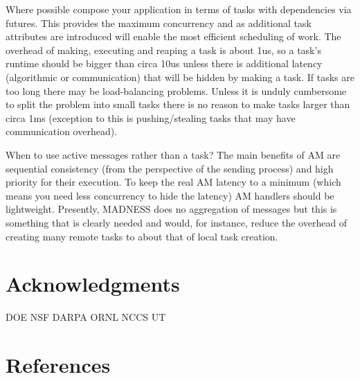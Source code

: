 \documentclass[letterpaper]{article}
\begin{document}
Where possible compose your application in terms of tasks with dependencies via futures. This provides the maximum
concurrency and as additional task attributes are introduced will enable the most efficient scheduling of work. The
overhead of making, executing and reaping a task is about 1us, so a task's runtime should be bigger than circa 10us
unless there is additional latency (algorithmic or communication) that will be hidden by making a task. If tasks are
too long there may be load-balancing problems. Unless it is unduly cumbersome to split the problem into small tasks
there is no reason to make tasks larger than circa 1ms (exception to this is pushing/stealing tasks that may have
communication overhead).

When to use active messages rather than a task? The main benefits of AM are sequential consistency (from the perspective
of the sending process) and high priority for their execution. To keep the real AM latency to a minimum (which means
you need less concurrency to hide the latency) AM handlers should be lightweight. Presently, MADNESS does no
aggregation of messages but this is something that is clearly needed and would, for instance, reduce the overhead of
creating many remote tasks to about that of local task creation.

\section{Acknowledgments}

\bigskip

DOE NSF DARPA ORNL NCCS UT

\section{References}

\bigskip
\end{document}
